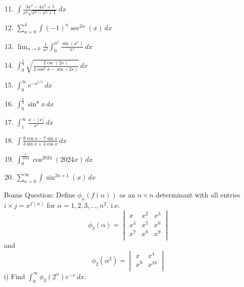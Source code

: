 \documentclass[12pt]{article}
\begin{document}
\begin{enumerate}
    \setcounter{enumi}{10}
    \item {\Large \( \displaystyle \int \frac{3x^4-4x^2+5}{x^6\sqrt{x^4-x^2+1}} \, dx \)}
    \vspace{.5cm}
    \item {\Large \( \displaystyle \sum_{n=0}^4 \int (-1)^n\sec^{2n} (x) \, dx \)}
    \vspace{.5cm}
    \item {\Large \( \displaystyle \lim_{n\to0}\frac{1}{n^2}\int_0^{n^2} \frac{\sin{(x^x)}}{x^x} \, dx \)}
    \vspace{.5cm}
    \item {\Large \( \displaystyle \int_0^{\frac{\pi}4} \sqrt{\frac{2\csc{(2x)}}{2\cos^2{x}-\sin{(2x)}}} \, dx \)}
    \vspace{.5cm}
    \item {\Large \( \displaystyle \int_0^{\infty} e^{-x^{1/5}} \, dx \)}
    \vspace{.5cm}
    \item {\Large \( \displaystyle \int_0^{\frac{\pi}{2}} \sin^8 x \, dx \)}
    \vspace{.5cm}
    \item {\Large \( \displaystyle \int_1^{\infty} \frac{x - \lfloor x \rfloor}{x^5} \, dx \)}
    \vspace{.5cm}
    \item {\Large \( \displaystyle \int \frac{9\cos x - 7\sin x}{3\sin x + 4\cos x } \, dx \)}
    \vspace{.5cm}
    \item {\Large \( \displaystyle \int_0^{\frac{\pi}{1012}} \cos^{2024}{(2024x)} \, dx \)}
    \vspace{.5cm}
    \item {\Large \( \displaystyle \sum_{n=0}^{\infty}\int \sin^{2n+1} (x) \, dx \)}
\end{enumerate}
\large Bonus Question: Define \(\phi_n(f(\alpha))\) as an \(n \times n\) determinant with all entries \(i\times j = x^{f(\alpha)}\) for \(\alpha = 1,2,3,\dotsc,n^2.\) i.e. 
\[\phi_3(\alpha) = \begin{vmatrix} x & x^2 & x^3 \\x^4 & x^5 & x^6 \\ x^7 & x^8 & x^9 \\ 
\end{vmatrix}\]
and
\[\phi_2(\alpha^2) = \begin{vmatrix} x & x^4 \\x^9 & x^{16} \\ 
\end{vmatrix}\]
i) Find \large \(\displaystyle \int_0^{\infty} \phi_3(2^{\alpha})e^{-x} \, dx \).
\end{document}
